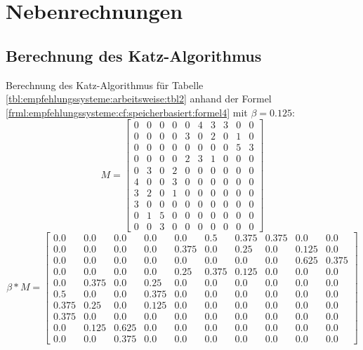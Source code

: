 \chapter{Nebenrechnungen}
\label{ch:nebenrechnungen}
\section{Berechnung des Katz-Algorithmus}
\label{ch:nebenrechnungen:katzZentralitaet}
Berechnung des Katz-Algorithmus für Tabelle \ref{tbl:empfehlungssysteme:arbeitsweise:tbl2} anhand der Formel \ref{frml:empfehlungssysteme:cf:speicherbasiert:formel4} mit $\beta = 0.125$:
\begin{equation}
	M = \begin{bmatrix}
		0 & 0 & 0 & 0 & 0 & 4 & 3 & 3 & 0 & 0\\
		0 & 0 & 0 & 0 & 3 & 0 & 2 & 0 & 1 & 0\\
		0 & 0 & 0 & 0 & 0 & 0 & 0 & 0 & 5 & 3\\
		0 & 0 & 0 & 0 & 2 & 3 & 1 & 0 & 0 & 0\\
		0 & 3 & 0 & 2 & 0 & 0 & 0 & 0 & 0 & 0\\
		4 & 0 & 0 & 3 & 0 & 0 & 0 & 0 & 0 & 0\\
		3 & 2 & 0 & 1 & 0 & 0 & 0 & 0 & 0 & 0\\
		3 & 0 & 0 & 0 & 0 & 0 & 0 & 0 & 0 & 0\\
		0 & 1 & 5 & 0 & 0 & 0 & 0 & 0 & 0 & 0\\
		0 & 0 & 3 & 0 & 0 & 0 & 0 & 0 & 0 & 0
	\end{bmatrix}
	\label{frml:berechnungDerKatzZentralitaet:formel1}
\end{equation}
\begin{equation}
	\beta * M = \begin{bmatrix}
		0.0 & 0.0 & 0.0 & 0.0 & 0.0 & 0.5 & 0.375 & 0.375 & 0.0 & 0.0\\
		0.0 & 0.0 & 0.0 & 0.0 & 0.375 & 0.0 & 0.25 & 0.0 & 0.125 & 0.0\\
		0.0 & 0.0 & 0.0 & 0.0 & 0.0 & 0.0 & 0.0 & 0.0 & 0.625 & 0.375\\
		0.0 & 0.0 & 0.0 & 0.0 & 0.25 & 0.375 & 0.125 & 0.0 & 0.0 & 0.0\\
		0.0 & 0.375 & 0.0 & 0.25 & 0.0 & 0.0 & 0.0 & 0.0 & 0.0 & 0.0\\
		0.5 & 0.0 & 0.0 & 0.375 & 0.0 & 0.0 & 0.0 & 0.0 & 0.0 & 0.0\\
		0.375 & 0.25 & 0.0 & 0.125 & 0.0 & 0.0 & 0.0 & 0.0 & 0.0 & 0.0\\
		0.375 & 0.0 & 0.0 & 0.0 & 0.0 & 0.0 & 0.0 & 0.0 & 0.0 & 0.0\\
		0.0 & 0.125 & 0.625 & 0.0 & 0.0 & 0.0 & 0.0 & 0.0 & 0.0 & 0.0\\
		0.0 & 0.0 & 0.375 & 0.0 & 0.0 & 0.0 & 0.0 & 0.0 & 0.0 & 0.0
	\end{bmatrix}
	\label{frml:berechnungDerKatzZentralitaet:formel2}
\end{equation}
